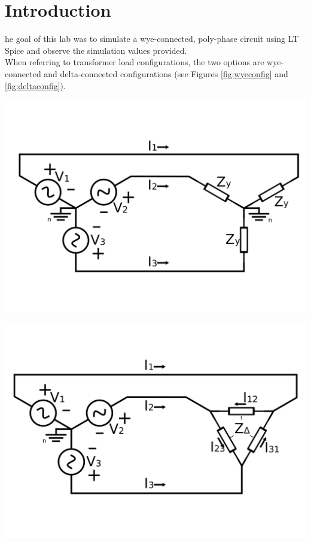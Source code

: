 \documentclass[journal]{IEEEtran}
\begin{document}
\section{Introduction}

\lowercase{he} goal of this lab was to simulate a  wye-connected, poly-phase circuit using LT Spice and observe the simulation values provided.\\

\noindent When referring to transformer load configurations, the two options are wye-connected and  delta-connected configurations (see Figures \ref{fig:wyeconfig} and \ref{fig:deltaconfig}).

\begingroup
    \centering
    \medskip
    \includegraphics[width=\columnwidth]{images/lab9_3.png}
    \label{fig:wyeconfig}
\endgroup


\begingroup
    \centering
    \medskip
    \includegraphics[width=\columnwidth]{images/lab9_4.png}
    \label{fig:deltaconfig}
\endgroup
\end{document}
